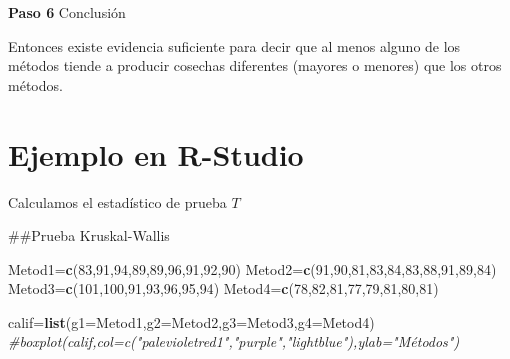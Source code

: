 \documentclass[a4paper,oneside,openany]{book}
\newenvironment{Shaded}{\begin{snugshade}}{\end{snugshade}}
\newcommand{\KeywordTok}[1]{\textcolor[rgb]{0.13,0.29,0.53}{\textbf{#1}}}
\newcommand{\DataTypeTok}[1]{\textcolor[rgb]{0.13,0.29,0.53}{#1}}
\newcommand{\DecValTok}[1]{\textcolor[rgb]{0.00,0.00,0.81}{#1}}
\newcommand{\CommentTok}[1]{\textcolor[rgb]{0.56,0.35,0.01}{\textit{#1}}}
\newcommand{\NormalTok}[1]{#1}
\begin{document}
\textbf{Paso 6} Conclusión

Entonces existe evidencia suficiente para decir que al menos alguno de
los métodos tiende a producir cosechas diferentes (mayores o menores)
que los otros métodos.

\section{Ejemplo en R-Studio}\label{ejemplo-en-r-studio-6}

Calculamos el estadístico de prueba \(T\)

\begin{Shaded}
\begin{Highlighting}[]
\NormalTok{##Prueba Kruskal-Wallis}

\NormalTok{Metod1=}\KeywordTok{c}\NormalTok{(}\DecValTok{83}\NormalTok{,}\DecValTok{91}\NormalTok{,}\DecValTok{94}\NormalTok{,}\DecValTok{89}\NormalTok{,}\DecValTok{89}\NormalTok{,}\DecValTok{96}\NormalTok{,}\DecValTok{91}\NormalTok{,}\DecValTok{92}\NormalTok{,}\DecValTok{90}\NormalTok{)    }
\NormalTok{Metod2=}\KeywordTok{c}\NormalTok{(}\DecValTok{91}\NormalTok{,}\DecValTok{90}\NormalTok{,}\DecValTok{81}\NormalTok{,}\DecValTok{83}\NormalTok{,}\DecValTok{84}\NormalTok{,}\DecValTok{83}\NormalTok{,}\DecValTok{88}\NormalTok{,}\DecValTok{91}\NormalTok{,}\DecValTok{89}\NormalTok{,}\DecValTok{84}\NormalTok{)}
\NormalTok{Metod3=}\KeywordTok{c}\NormalTok{(}\DecValTok{101}\NormalTok{,}\DecValTok{100}\NormalTok{,}\DecValTok{91}\NormalTok{,}\DecValTok{93}\NormalTok{,}\DecValTok{96}\NormalTok{,}\DecValTok{95}\NormalTok{,}\DecValTok{94}\NormalTok{)        }
\NormalTok{Metod4=}\KeywordTok{c}\NormalTok{(}\DecValTok{78}\NormalTok{,}\DecValTok{82}\NormalTok{,}\DecValTok{81}\NormalTok{,}\DecValTok{77}\NormalTok{,}\DecValTok{79}\NormalTok{,}\DecValTok{81}\NormalTok{,}\DecValTok{80}\NormalTok{,}\DecValTok{81}\NormalTok{)}

\NormalTok{calif=}\KeywordTok{list}\NormalTok{(}\DataTypeTok{g1=}\NormalTok{Metod1,}\DataTypeTok{g2=}\NormalTok{Metod2,}\DataTypeTok{g3=}\NormalTok{Metod3,}\DataTypeTok{g4=}\NormalTok{Metod4)}
\CommentTok{#boxplot(calif,col=c("palevioletred1","purple","lightblue"),ylab="Métodos")}




\end{Highlighting}
\end{Shaded}
\end{document}
